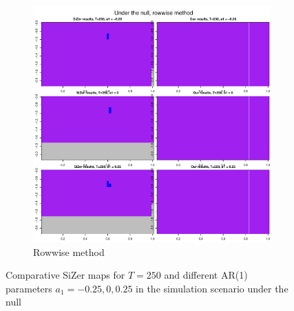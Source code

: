 \documentclass[a4paper,12pt]{article}
\begin{document}
\begin{figure}[t!]
\begin{subfigure}[b]{0.475\textwidth}
\includegraphics[width=\textwidth]{Plots/SiZer_comparison_under_null_rowwise_T_250.pdf}
\caption{Rowwise method}
\end{subfigure}
\caption{Comparative SiZer maps for $T = 250$ and different AR(1) parameters $a_1 = -0.25, 0, 0.25$ in the simulation scenario under the null}\label{fig:SiZer_maps_comparison_null}
\end{figure}
\end{document}
